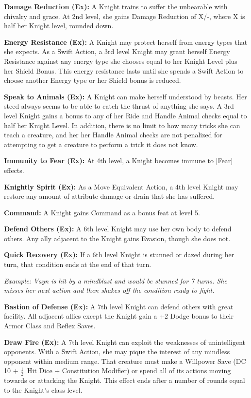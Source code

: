 \documentclass[10pt]{article}
\newcommand{\ability}[2]{\smallskip \noindent \textbf{#1} #2}
\newcommand{\example}[1]{\emph{#1}}
\newcommand{\half}[0]{\ensuremath{\frac{1}{2}}}
\begin{document}
\ability{Damage Reduction (Ex):}{A Knight trains to suffer the unbearable with chivalry and grace. At 2nd level, she gains Damage Reduction of X/-, where X is half her Knight level, rounded down.}

\ability{Energy Resistance (Ex):}{A Knight may protect herself from energy types that she expects. As a Swift Action, a 3rd level Knight may grant herself Energy Resistance against any energy type she chooses equal to her Knight Level plus her Shield Bonus. This energy resistance lasts until she spends a Swift Action to choose another Energy type or her Shield bonus is reduced.}

\ability{Speak to Animals (Ex):}{A Knight can make herself understood by beasts. Her steed always seems to be able to catch the thrust of anything she says. A 3rd level Knight gains a bonus to any of her Ride and Handle Animal checks equal to half her Knight Level. In addition, there is no limit to how many tricks she can teach a creature, and her her Handle Animal checks are not penalized for attempting to get a creature to perform a trick it does not know.}

\ability{Immunity to Fear (Ex):}{At 4th level, a Knight becomes immune to [Fear] effects.}

\ability{Knightly Spirit (Ex):}{As a Move Equivalent Action, a 4th level Knight may restore any amount of attribute damage or drain that she has suffered.}

\ability{Command:}{A Knight gains Command as a bonus feat at level 5.}

\ability{Defend Others (Ex):}{A 6th level Knight may use her own body to defend others. Any ally adjacent to the Knight gains Evasion, though she does not.}

\ability{Quick Recovery (Ex):}{If a 6th level Knight is stunned or dazed during her turn, that condition ends at the end of that turn. \smallskip

\example{Example: Vayn is hit by a mindblast and would be stunned for 7 turns. She misses her next action and then shakes off the condition ready to fight.}}

\ability{Bastion of Defense (Ex):}{A 7th level Knight can defend others with great facility. All adjacent allies except the Knight gain a +2 Dodge bonus to their Armor Class and Reflex Saves.}

\ability{Draw Fire (Ex):}{A 7th level Knight can exploit the weaknesses of unintelligent opponents. With a Swift Action, she may pique the interest of any mindless opponent within medium range. That creature must make a Willpower Save (DC 10 + \half\  Hit Dice + Constitution Modifier) or spend all of its actions moving towards or attacking the Knight. This effect ends after a number of rounds equal to the Knight's class level.}
\end{document}
